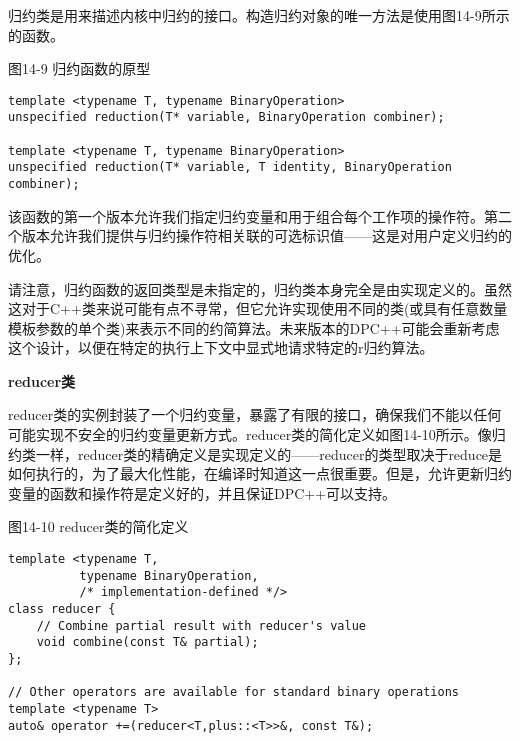 归约类是用来描述内核中归约的接口。构造归约对象的唯一方法是使用图14-9所示的函数。\par

\hspace*{\fill} \par %
图14-9 归约函数的原型
\begin{lstlisting}[caption={}]
template <typename T, typename BinaryOperation>
unspecified reduction(T* variable, BinaryOperation combiner);

template <typename T, typename BinaryOperation>
unspecified reduction(T* variable, T identity, BinaryOperation combiner);
\end{lstlisting}

该函数的第一个版本允许我们指定归约变量和用于组合每个工作项的操作符。第二个版本允许我们提供与归约操作符相关联的可选标识值——这是对用户定义归约的优化。\par

请注意，归约函数的返回类型是未指定的，归约类本身完全是由实现定义的。虽然这对于C++类来说可能有点不寻常，但它允许实现使用不同的类(或具有任意数量模板参数的单个类)来表示不同的约简算法。未来版本的DPC++可能会重新考虑这个设计，以便在特定的执行上下文中显式地请求特定的r归约算法。\par

\hspace*{\fill} \par %
\textbf{reducer类}

reducer类的实例封装了一个归约变量，暴露了有限的接口，确保我们不能以任何可能实现不安全的归约变量更新方式。reducer类的简化定义如图14-10所示。像归约类一样，reducer类的精确定义是实现定义的——reducer的类型取决于reduce是如何执行的，为了最大化性能，在编译时知道这一点很重要。但是，允许更新归约变量的函数和操作符是定义好的，并且保证DPC++可以支持。\par

\hspace*{\fill} \par %
图14-10 reducer类的简化定义
\begin{lstlisting}[caption={}]
template <typename T,
		  typename BinaryOperation,
	      /* implementation-defined */>
class reducer {
	// Combine partial result with reducer's value
	void combine(const T& partial);
};

// Other operators are available for standard binary operations
template <typename T>
auto& operator +=(reducer<T,plus::<T>>&, const T&);
\end{lstlisting}

